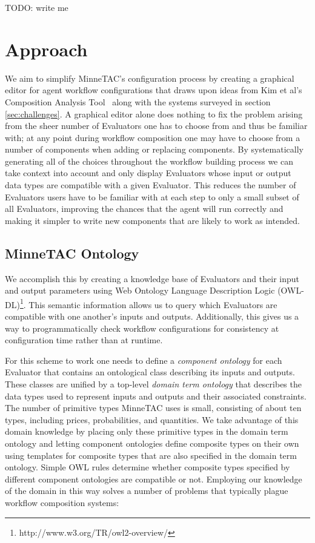 \documentclass{article}
\begin{document}
TODO:  write me

\section{Approach}

We aim to simplify MinneTAC's configuration process by creating a graphical editor for agent workflow configurations that draws upon ideas from Kim et al's Composition Analysis Tool~\cite{kim2004intelligent} along with the systems surveyed in section \ref{sec:challenges}.
A graphical editor alone does nothing to fix the problem arising from the sheer number of Evaluators one has to choose from and thus be familiar with; at any point during workflow composition one may have to choose from a number of components when adding or replacing components.
By systematically generating all of the choices throughout the workflow building process we can take context into account and only display Evaluators whose input or output data types are compatible with a given Evaluator.
This reduces the number of Evaluators users have to be familiar with at each step to only a small subset of all Evaluators, improving the chances that the agent will run correctly and making it simpler to write new components that are likely to work as intended.

\subsection{MinneTAC Ontology}

We accomplish this by creating a knowledge base of Evaluators and their input and output parameters using Web Ontology Language Description Logic (OWL-DL)\footnote{http://www.w3.org/TR/owl2-overview/}.
This semantic information allows us to query which Evaluators are compatible with one another's inputs and outputs.
Additionally, this gives us a way to programmatically check workflow configurations for consistency at configuration time rather than at runtime.

For this scheme to work one needs to define a \emph{component ontology} for each Evaluator that contains an ontological class describing its inputs and outputs.
These classes are unified by a top-level \emph{domain term ontology} that describes the data types used to represent inputs and outputs and their associated constraints.
The number of primitive types MinneTAC uses is small, consisting of about ten types, including prices, probabilities, and quantities.
We take advantage of this domain knowledge by placing only these primitive types in the domain term ontology and letting component ontologies define composite types on their own using templates for composite types that are also specified in the domain term ontology.
Simple OWL rules determine whether composite types specified by different component ontologies are compatible or not.
Employing our knowledge of the domain in this way solves a number of problems that typically plague workflow composition systems:
\end{document}
